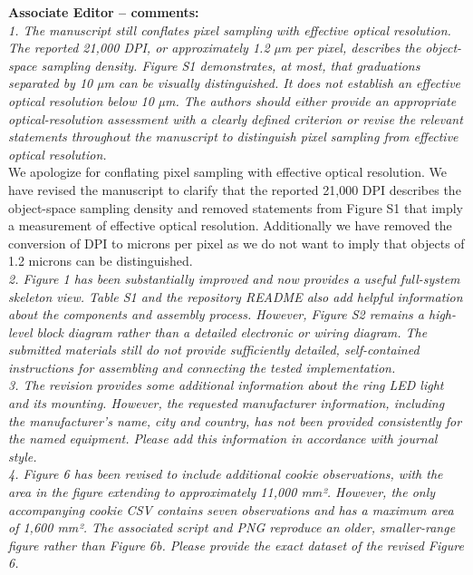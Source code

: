 \documentclass[12pt,a4paper]{article}
\begin{document}
{\bf Associate Editor -- comments:} \\

\emph{1.      The manuscript still conflates pixel sampling with effective optical resolution. The reported 21,000 DPI, or approximately 1.2 µm per pixel, describes the object-space sampling density. Figure S1 demonstrates, at most, that graduations separated by 10 µm can be visually distinguished. It does not establish an effective optical resolution below 10 µm. The authors should either provide an appropriate optical-resolution assessment with a clearly defined criterion or revise the relevant statements throughout the manuscript to distinguish pixel sampling from effective optical resolution.} \\

We apologize for conflating pixel sampling with effective optical resolution. We have revised the manuscript to clarify that the reported 21,000 DPI describes the object-space sampling density and removed statements from Figure S1 that imply a measurement of effective optical resolution. Additionally we have removed the conversion of DPI to microns per pixel as we do not want to imply that objects of 1.2 microns can be distinguished. \\ 

\emph{2.      Figure 1 has been substantially improved and now provides a useful full-system skeleton view. Table S1 and the repository README also add helpful information about the components and assembly process. However, Figure S2 remains a high-level block diagram rather than a detailed electronic or wiring diagram. The submitted materials still do not provide sufficiently detailed, self-contained instructions for assembling and connecting the tested implementation.} \\

\emph{3.      The revision provides some additional information about the ring LED light and its mounting. However, the requested manufacturer information, including the manufacturer’s name, city and country, has not been provided consistently for the named equipment. Please add this information in accordance with journal style.} \\

\emph{4.      Figure 6 has been revised to include additional cookie observations, with the area in the figure extending to approximately 11,000 mm². However, the only accompanying cookie CSV contains seven observations and has a maximum area of 1,600 mm². The associated script and PNG reproduce an older, smaller-range figure rather than Figure 6b. Please provide the exact dataset of the revised Figure 6.} \\
\end{document}
